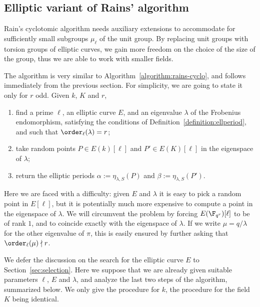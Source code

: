 \subsection{Elliptic variant of Rains' algorithm}

Rain's cyclotomic algorithm needs auxiliary extensions to accommodate
for sufficiently small subgroups $\mu_\ell$ of the unit group. By
replacing unit groups with torsion groups of elliptic curves, we gain
more freedom on the choice of the size of the group, thus we are able
to work with smaller fields.  

The algorithm is very similar to
Algorithm~\ref{algorithm:rains-cyclo}, and follows immediately from
the previous section. For simplicity, we are going to state it only
for $r$ odd. Given $k$, $K$ and $r$,
\begin{enumerate}
\item find a prime $\ell$, an elliptic curve $E$, and an eigenvalue
  $\lambda$ of the Frobenius endomorphism, satisfying the conditions
  of Definition~\ref{definition:ellperiod}, and such that
  $\order_\ell(\lambda)=r$;
\item take random points $P\in E(k)[\ell]$ and $P'\in E(K)[\ell]$ in
  the eigenspace of $\lambda$;
\item return the elliptic periods $\alpha := \eta_{\lambda,S}(P)$ and
  $\beta:= \eta_{\lambda,S}(P')$.
\end{enumerate}

Here we are faced with a difficulty: given $E$ and $\lambda$ it is
easy to pick a random point in $E[\ell]$, but it is potentially much
more expensive to compute a point in the eigenspace of $\lambda$. We
will circumvent the problem by forcing $E(\F_{q^r})[\ell]$ to be of
rank $1$, and to coincide exactly with the eigenspace of $\lambda$.
If we write $\mu = q/\lambda$ for the other eigenvalue of $\pi$, this
is easily ensured by further asking that $\order_\ell(\mu) \nmid r$.

We defer the discussion on the search for the elliptic curve $E$ to
Section~\ref{sec:selection}. Here we suppose that we are already given
suitable parameters $\ell$, $E$ and $\lambda$, and analyze the last
two steps of the algorithm, summarized below.  We only give the
procedure for $k$, the procedure for the field $K$ being
identical.

